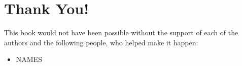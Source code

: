 \section*{Thank You!}

This book would not have been possible without the support of each of the
authors and the following people, who helped make it happen:
\begin{itemize}
 \item NAMES
\end{itemize}

\newpage
